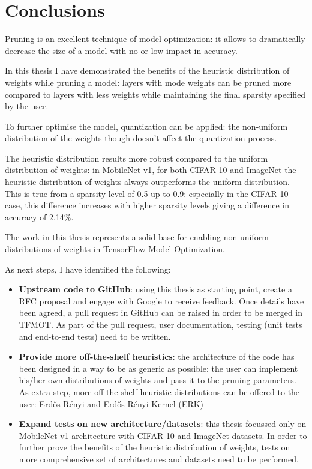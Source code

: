 \chapter{Conclusions}
Pruning is an excellent technique of model optimization: it allows to
dramatically decrease the size of a model with no or low impact in accuracy.

In this thesis I have demonstrated the benefits of the heuristic distribution
of weights while pruning a model: layers with mode weights can be pruned more
compared to layers with less weights while maintaining the final sparsity
specified by the user.

To further optimise the model, quantization can be applied: the non-uniform
distribution of the weights though doesn't affect the quantization process.

The heuristic distribution results more robust compared to the uniform
distribution of weights: in MobileNet v1, for both CIFAR-10 and ImageNet the
heuristic distribution of weights always outperforms the uniform distribution.
This is true from a sparsity level of 0.5 up to 0.9: especially in the CIFAR-10
case, this difference increases with higher sparsity levels giving a difference
in accuracy of 2.14\%.

The work in this thesis represents a solid base for enabling non-uniform
distributions of weights in TensorFlow Model Optimization.

As next steps, I have identified the following:

\begin{itemize}
    \item \textbf{Upstream code to GitHub}: using this thesis as starting
        point, create a RFC proposal and engage with Google to receive
        feedback. Once details have been agreed, a pull request in GitHub
        can be raised in order to be merged in TFMOT\@.
        As part of the pull request, user documentation, testing (unit tests
        and end-to-end tests) need to be written.
    \item \textbf{Provide more off-the-shelf heuristics}: the architecture of
        the code has been designed in a way to be as generic as possible: the
        user can implement his/her own distributions of weights and pass
        it to the pruning parameters.
        As extra step, more off-the-shelf heuristic distributions can be
        offered to the user: Erd\H{o}s-R\'{e}nyi and Erd\H{o}s-R\'{e}nyi-Kernel
        (ERK)\cite{rigl}
    \item \textbf{Expand tests on new architecture/datasets}: this thesis
        focussed only on MobileNet v1 architecture with CIFAR-10 and ImageNet
        datasets. In order to further prove the benefits of the heuristic
        distribution of weights, tests on more comprehensive set of
        architectures and datasets need to be performed.
\end{itemize}
